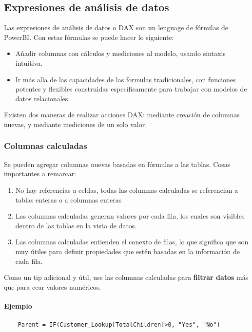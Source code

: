 \subsection{Expresiones de análisis de datos}


Las expresiones de análisis de datos o DAX son un lenguage de fórmilas de PowerBI. Con estas fórmulas se puede hacer lo siguiente:

\begin{itemize}
    \item Añadir columnas con cálculos y mediciones al modelo, usando sintaxis intuitiva.
    \item Ir más alla de las capacidades de las formulas tradicionales, con funciones potentes y flexibles construidas específicamente para trabajar con modelos de datos relacionales.
\end{itemize}

Existen dos maneras de realizar acciones DAX: mediante creación de columnas nuevas, y mediante mediciones de un solo valor.


\subsubsection{Columnas calculadas}

Se pueden agregar columnas nuevas basadas en fórmulas a las tablas. Cosas importantes a remarcar:

\begin{enumerate}
    \item No hay referencias a celdas, todas las columnas calculadas se referencian a tablas enteras o a columnas enteras
    \item Las columnas calculadas generan valores por cada fila, los cuales son visibles dentro de las tablas en la vista de datos.
    \item Las columnas calculadas entienden el conexto de filas, lo que significa que son muy útiles para definir propiedades que estén basadas en la información de cada fila.
\end{enumerate}

Como un tip adicional y útil, use las columnas calculadas para \textbf{filtrar datos} más que para cear valores numéricos.


\paragraph*{Ejemplo}

\begin{verbatim}
    Parent = IF(Customer_Lookup[TotalChildren]>0, "Yes", "No")
\end{verbatim}

